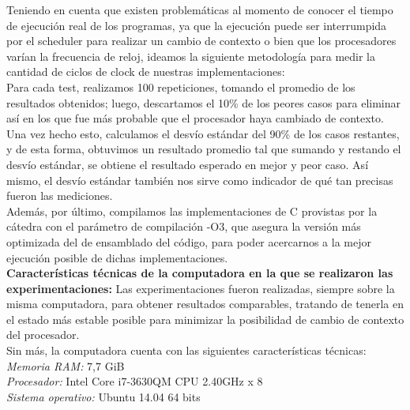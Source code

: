Teniendo en cuenta que existen problemáticas al momento de conocer el tiempo de ejecución real de los programas, ya que la ejecución puede ser interrumpida por el scheduler para realizar un cambio de contexto o bien que los procesadores varían la frecuencia de reloj, ideamos la siguiente metodología para medir la cantidad de ciclos de clock de nuestras implementaciones:\\
Para cada test, realizamos 100 repeticiones, tomando el promedio de los resultados obtenidos; luego, descartamos el 10\% de los peores casos para eliminar así en los que fue más probable que el procesador haya cambiado de contexto. Una vez hecho esto, calculamos el desvío estándar del 90\% de los casos restantes, y de esta forma, obtuvimos un resultado promedio tal que sumando y restando el desvío estándar, se obtiene el resultado esperado en mejor y peor caso. Así mismo, el desvío estándar también nos sirve como indicador de qué tan precisas fueron las mediciones.\\
Además, por último, compilamos las implementaciones de C provistas por la cátedra con el parámetro de compilación -O3, que asegura la versión más optimizada del de ensamblado del código, para poder acercarnos a la mejor ejecución posible de dichas implementaciones.\\

\textbf{Características técnicas de la computadora en la que se realizaron las experimentaciones:}
Las experimentaciones fueron realizadas, siempre sobre la misma computadora, para obtener resultados comparables, tratando de tenerla en el estado más estable posible para minimizar la posibilidad de cambio de contexto del procesador.\\
Sin más, la computadora cuenta con las siguientes características técnicas:\\

\textit{Memoria RAM:} 7,7 GiB\\
\textit{Procesador:} Intel Core i7-3630QM CPU \@ 2.40GHz x 8\\
\textit{Sistema operativo:} Ubuntu 14.04 64 bits\\

